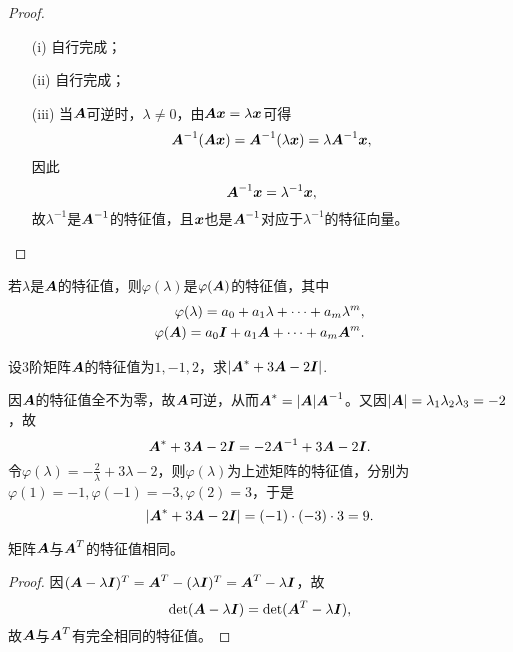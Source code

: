 \begin{frame}[fragile]\ft{\subsecname}  

\begin{proof}
  \begin{itemize}
  \item[(i)]  自行完成；
  \item[(ii)] 自行完成；
  \item[(iii)] 当$\boldsymbol{A}$可逆时，$\lambda\ne0$，由$\boldsymbol{A}{\boldsymbol{x}}=\lambda{\boldsymbol{x}}$可得
    $$
    \boldsymbol{A}^{-1}(\boldsymbol{A}{\boldsymbol{x}})=\boldsymbol{A}^{-1}(\lambda{\boldsymbol{x}})=\lambda\boldsymbol{A}^{-1}{\boldsymbol{x}},
    $$
    因此
    $$
    \boldsymbol{A}^{-1}{\boldsymbol{x}}=\lambda^{-1}{\boldsymbol{x}},
    $$
    故$\lambda^{-1}$是$\boldsymbol{A}^{-1}$的特征值，且${\boldsymbol{x}}$也是$\boldsymbol{A}^{-1}$对应于$\lambda^{-1}$的特征向量。
  \end{itemize}
\end{proof}
\end{frame}

\begin{frame}[fragile]\ft{\subsecname}  

\begin{zhu*}
  若$\lambda$是$\boldsymbol{A}$的特征值，则$\varphi(\lambda)$是$\varphi(\boldsymbol{A})$的特征值，其中
  $$
  \begin{aligned}
    \varphi(\lambda)=a_0+a_1\lambda+\cdots+a_m\lambda^m,\\
    \varphi(\boldsymbol{A})=a_0\boldsymbol{I}+a_1\boldsymbol{A}+\cdots+a_m\boldsymbol{A}^m.
  \end{aligned}
  $$
\end{zhu*}
\end{frame}

\begin{frame}[fragile]\ft{\subsecname}  

\begin{li}
  设$3$阶矩阵$\boldsymbol{A}$的特征值为$1,-1,2$，求$|\boldsymbol{A}^*+3\boldsymbol{A}-2\boldsymbol{I}|$.
\end{li} \pause 
\begin{jie}
  因$\boldsymbol{A}$的特征值全不为零，故$\boldsymbol{A}$可逆，从而$\boldsymbol{A}^*=|\boldsymbol{A}|\boldsymbol{A}^{-1}$。又因$|\boldsymbol{A}|=\lambda_1\lambda_2\lambda_3=-2$，故
  $$
  \boldsymbol{A}^*+3\boldsymbol{A}-2\boldsymbol{I}=-2\boldsymbol{A}^{-1}+3\boldsymbol{A}-2\boldsymbol{I}.
  $$
  令$\varphi(\lambda)=-\frac2\lambda+3\lambda-2$，则$\varphi(\lambda)$为上述矩阵的特征值，分别为$\varphi(1)=-1,\varphi(-1)=-3,\varphi(2)=3$，于是
  $$
  |\boldsymbol{A}^*+3\boldsymbol{A}-2\boldsymbol{I}|=(-1)\cdot(-3)\cdot3=9.
  $$
\end{jie}
\end{frame}

\begin{frame}[fragile]\ft{\subsecname}  

\begin{xingzhi}
  矩阵$\boldsymbol{A}$与$\boldsymbol{A}^T$的特征值相同。
\end{xingzhi} \pause 
\begin{proof}
  因$(\boldsymbol{A}-\lambda\boldsymbol{I})^T=\boldsymbol{A}^T-(\lambda\boldsymbol{I})^T=\boldsymbol{A}^T-\lambda\boldsymbol{I}$，故
  $$
  \mathrm{det}(\boldsymbol{A}-\lambda\boldsymbol{I})=\mathrm{det}(\boldsymbol{A}^T-\lambda\boldsymbol{I}),
  $$
  故$\boldsymbol{A}$与$\boldsymbol{A}^T$有完全相同的特征值。
\end{proof}



\end{frame}

